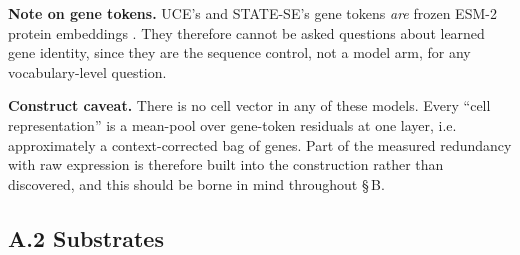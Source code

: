 \textbf{Note on gene tokens.} UCE's and STATE-SE's gene tokens \emph{are} frozen ESM-2 protein embeddings \citep{lin2023esm2}. They
therefore cannot be asked questions about learned gene identity, since they are the sequence control, not a
model arm, for any vocabulary-level question.

\textbf{Construct caveat.} There is no cell vector in any of these
models. Every ``cell representation'' is a mean-pool over gene-token residuals at one layer, i.e.
approximately a context-corrected bag of genes. Part of the measured redundancy with raw expression is
therefore built into the construction rather than discovered, and this should be borne in mind
throughout \S\,B.

\hypertarget{a.2-substrates}{%
\subsection{A.2 Substrates}\label{a.2-substrates}}

